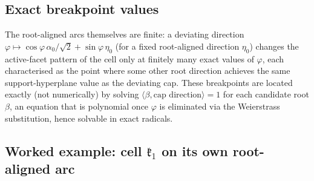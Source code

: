\documentclass[11pt,reqno]{amsart}
\renewcommand{\_}{\origunderscore\allowbreak}
\numberwithin{equation}{section}
\theoremstyle{plain}
\theoremstyle{definition}
\theoremstyle{remark}
\newcommand{\Cell}[1]{\mathfrak{k}_{#1}}     %
\newcommand{\tilt}{\varphi}                  %
\newcommand{\dev}{\eta}                      %
\begin{document}
\subsection{Exact breakpoint values}

The root-aligned arcs themselves are finite: a deviating direction
$\tilt\mapsto\cos\tilt\,\alpha_0/\sqrt2+\sin\tilt\,\dev_0$ (for a fixed
root-aligned direction $\dev_0$) changes the active-facet pattern of the
cell only at finitely many exact values of $\tilt$, each characterised as
the point where some other root direction achieves the same support-hyperplane
value as the deviating cap. These breakpoints are located exactly (not
numerically) by solving $\langle\beta,\text{cap direction}\rangle=1$ for
each candidate root $\beta$, an equation that is polynomial once
$\tilt$ is eliminated via the Weierstrass substitution, hence solvable
in exact radicals.

\subsection{Worked example: cell $\Cell1$ on its own root-aligned arc}
\end{document}
